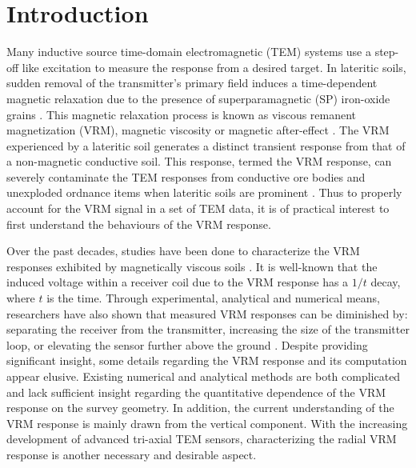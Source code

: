 \documentclass[onecolumn]{IEEEtran} %
\begin{document}
\section{Introduction}
Many inductive source time-domain electromagnetic (TEM) systems use a step-off like excitation to measure the response from a desired target. In lateritic soils, sudden removal of the transmitter's primary field induces a time-dependent magnetic relaxation due to the presence of superparamagnetic (SP) iron-oxide grains \citep{Buselli1982, Barsukov2001,Billings2003,Pasion2007,Zadorozhnaya2012}. This magnetic relaxation process is known as viscous remanent magnetization (VRM), magnetic viscosity or magnetic after-effect \citep{Dabas1992,Neel1949,Moskowitz1985}. The VRM experienced by a lateritic soil generates a distinct transient response from that of a non-magnetic conductive soil. This response, termed the VRM response, can severely contaminate the TEM responses from conductive ore bodies and unexploded ordnance items when lateritic soils are prominent \citep{Butler2003, Billings2003,Pasion2007,Buselli1982,Barsukov2001,Zadorozhnaya2012}. Thus to properly account for the VRM signal in a set of TEM data, it is of practical interest to first understand the behaviours of the VRM response.

Over the past decades, studies have been done to characterize the VRM responses exhibited by magnetically viscous soils \citep{Pasion2002, Butler2003, Billings2003,Pasion2007,Buselli1982,Barsukov2001,Zadorozhnaya2012}.  It is well-known that the induced voltage within a receiver coil due to the VRM  response has a $1/t$ decay, where $t$ is the time. Through experimental, analytical and numerical means, researchers have also shown  that measured VRM responses can be diminished by: separating the receiver from the transmitter, increasing the size of the transmitter loop, or elevating the sensor further above the ground \citep{Lee1984, Buselli1982, Barsukov2001, Das2006, Kozhevnikov2007, Zadorozhnaya2012}. Despite providing significant insight, some details regarding the VRM response and its computation appear elusive. Existing numerical and analytical methods \citep{Billings2003, Kozhevnikov2007, Pasion2007, Barsukov2001,Das2004, Druyts2009, Lee1984, Das2006} are both complicated and lack  sufficient insight regarding the quantitative dependence of the VRM  response on the survey geometry. In addition, the current understanding of the VRM response is mainly drawn from the vertical component. With the increasing development of advanced tri-axial TEM sensors, characterizing the radial VRM response is another necessary and desirable aspect.
\end{document}
